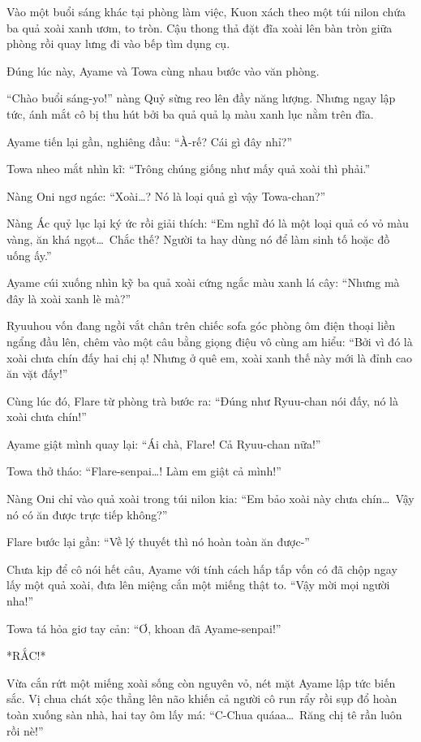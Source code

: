 \documentclass[../main.tex]{subfiles}
\begin{document}
Vào một buổi sáng khác tại phòng làm việc, Kuon xách theo một túi nilon chứa ba quả xoài xanh ươm, to tròn. Cậu thong thả đặt đĩa xoài lên bàn tròn giữa phòng rồi quay lưng đi vào bếp tìm dụng cụ.

Đúng lúc này, Ayame và Towa cùng nhau bước vào văn phòng.

``Chào buổi sáng-yo!'' nàng Quỷ sừng reo lên đầy năng lượng. Nhưng ngay lập tức, ánh mắt cô bị thu hút bởi ba quả quả lạ màu xanh lục nằm trên đĩa.

Ayame tiến lại gần, nghiêng đầu: ``À-rế? Cái gì đây nhỉ?''

Towa nheo mắt nhìn kĩ: ``Trông chúng giống như mấy quả xoài thì phải.''

Nàng Oni ngơ ngác: ``Xoài\dots? Nó là loại quả gì vậy Towa-chan?''

Nàng Ác quỷ lục lại ký ức rồi giải thích: ``Em nghĩ đó là một loại quả có vỏ màu vàng, ăn khá ngọt\dots\ Chắc thế? Người ta hay dùng nó để làm sinh tố hoặc đồ uống ấy.''

Ayame cúi xuống nhìn kỹ ba quả xoài cứng ngắc màu xanh lá cây: ``Nhưng mà đây là xoài xanh lè mà?''

Ryuuhou vốn đang ngồi vắt chân trên chiếc sofa góc phòng ôm điện thoại liền ngẩng đầu lên, chêm vào một câu bằng giọng điệu vô cùng am hiểu: ``Bởi vì đó là xoài chưa chín đấy hai chị ạ! Nhưng ở quê em, xoài xanh thế này mới là đỉnh cao ăn vặt đấy!''

Cùng lúc đó, Flare từ phòng trà bước ra: ``Đúng như Ryuu-chan nói đấy, nó là xoài chưa chín!''

Ayame giật mình quay lại: ``Ái chà, Flare! Cả Ryuu-chan nữa!''

Towa thở tháo: ``Flare-senpai\dots! Làm em giật cả mình!''

Nàng Oni chỉ vào quả xoài trong túi nilon kia: ``Em bảo xoài này chưa chín\dots\ Vậy nó có ăn được trực tiếp không?''

Flare bước lại gần: ``Về lý thuyết thì nó hoàn toàn ăn được-''

Chưa kịp để cô nói hết câu, Ayame với tính cách hấp tấp vốn có đã chộp ngay lấy một quả xoài, đưa lên miệng cắn một miếng thật to. ``Vậy mời mọi người nha!''

Towa tá hỏa giơ tay cản: ``Ơ, khoan đã Ayame-senpai!''

*RẮC!*

Vừa cắn rứt một miếng xoài sống còn nguyên vỏ, nét mặt Ayame lập tức biến sắc. Vị chua chát xộc thẳng lên não khiến cả người cô run rẩy rồi sụp đổ hoàn toàn xuống sàn nhà, hai tay ôm lấy má: ``C-Chua quáaa\dots\ Răng chị tê rần luôn rồi nè!''
\end{document}
